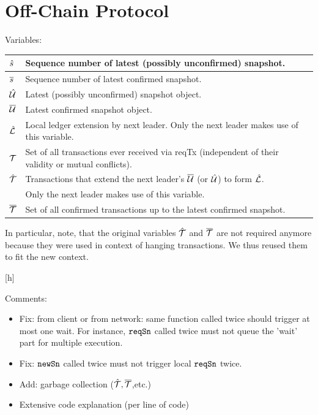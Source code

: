 \section{Off-Chain Protocol}

Variables:

\begin{center}
\begin{tabular}{|l|l|}\hline
  $\hat s$  & Sequence number of latest (possibly unconfirmed) snapshot. \\ \hline
  $\overline s$  & Sequence number of latest confirmed snapshot. \\ \hline
  $\hat {\mathcal U}$ & Latest (possibly unconfirmed) snapshot object. \\ \hline
  $\overline {\mathcal U}$ & Latest confirmed snapshot object. \\ \hline
  $\hat {\mathcal L}$ & Local ledger extension by next leader. Only the next leader
  makes use of this variable.\\ \hline
  ${\mathcal T}$    & Set of all transactions ever received via reqTx (independent of their validity or mutual conflicts).\\  \hline
  $\hat {\mathcal T}$ & Transactions that extend the next leader's $\overline {\mathcal U}$ (or $\hat {\mathcal U}$) to form $\hat {\mathcal L}$.\\
           & Only the next leader makes use of this variable.\\  \hline
  $\overline {\mathcal T}$ & Set of all confirmed transactions up to the latest confirmed snapshot.\\  \hline
\end{tabular}
\end{center}

In particular, note, that the original variables $\hat {\mathcal T}$ and $\overline {\mathcal T}$ are not required anymore because they
were used in context of hanging transactions. We thus reused them to fit the new context.

[h]

Comments: 
\begin{itemize}
\item Fix: from client or from network: same function called twice should trigger at most one wait.
  For instance, $\mathtt{reqSn}$ called twice must not queue the 'wait' part for multiple execution.
\item Fix: $\mathtt{newSn}$ called twice must not trigger local $\mathtt{reqSn}$ twice.
\item Add: garbage collection ($\hat {\mathcal T},\overline {\mathcal T}$,etc.)
\item Extensive code explanation (per line of code)
\end{itemize}


